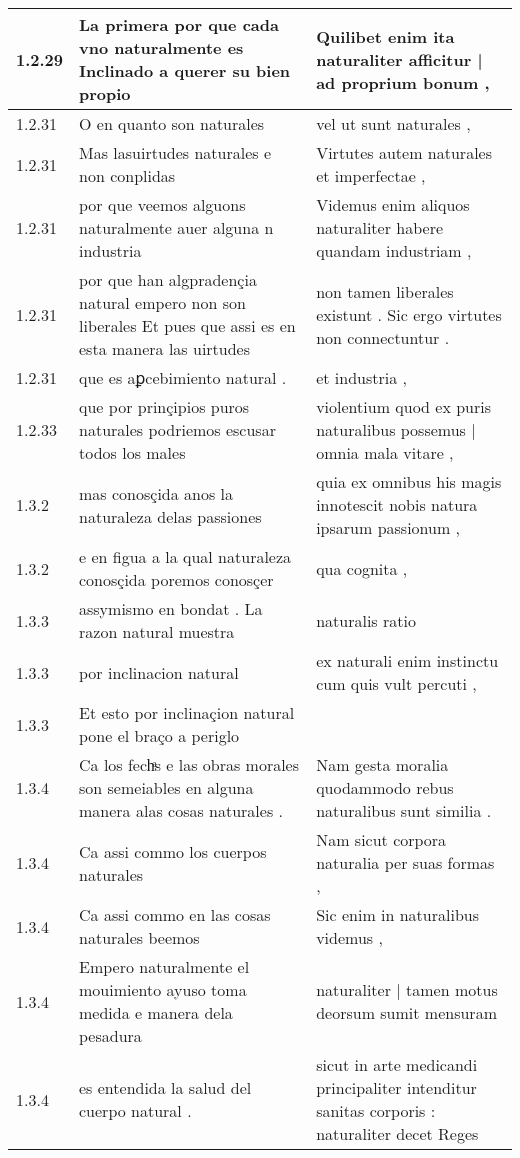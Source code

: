 \begin{tabular}{|p{1cm}|p{6.5cm}|p{6.5cm}|}
1.2.29 & La primera por que cada vno naturalmente es Inclinado a querer su bien propio & Quilibet enim ita naturaliter afficitur | ad proprium bonum , \\\hline
1.2.31 & O en quanto son naturales & vel ut sunt naturales , \\\hline
1.2.31 & Mas lasuirtudes naturales e non conplidas & Virtutes autem naturales et imperfectae , \\\hline
1.2.31 & por que veemos alguons naturalmente auer alguna n industria & Videmus enim aliquos naturaliter habere quandam industriam , \\\hline
1.2.31 & por que han algpradençia natural empero non son liberales Et pues que assi es en esta manera las uirtudes & non tamen liberales existunt . Sic ergo virtutes non connectuntur . \\\hline
1.2.31 & que es aꝑcebimiento natural . & et industria , \\\hline
1.2.33 & que por prinçipios puros naturales podriemos escusar todos los males & violentium quod ex puris naturalibus possemus | omnia mala vitare , \\\hline
1.3.2 & mas conosçida anos la naturaleza delas passiones & quia ex omnibus his magis innotescit nobis natura ipsarum passionum , \\\hline
1.3.2 & e en figua a la qual naturaleza conosçida poremos conosçer & qua cognita , \\\hline
1.3.3 & assymismo en bondat . La razon natural muestra & naturalis ratio \\\hline
1.3.3 & por inclinacion natural & ex naturali enim instinctu cum quis vult percuti , \\\hline
1.3.3 & Et esto por inclinaçion natural pone el braço a periglo &  \\\hline
1.3.4 & Ca los fechͣs e las obras morales son semeiables en alguna manera alas cosas naturales . & Nam gesta moralia quodammodo rebus naturalibus sunt similia . \\\hline
1.3.4 & Ca assi commo los cuerpos naturales & Nam sicut corpora naturalia per suas formas , \\\hline
1.3.4 & Ca assi commo en las cosas naturales beemos & Sic enim in naturalibus videmus , \\\hline
1.3.4 & Empero naturalmente el mouimiento ayuso toma medida e manera dela pesadura & naturaliter | tamen motus deorsum sumit mensuram \\\hline
1.3.4 & es entendida la salud del cuerpo natural . & sicut in arte medicandi principaliter intenditur sanitas corporis : naturaliter decet Reges \\\hline

\end{tabular}
